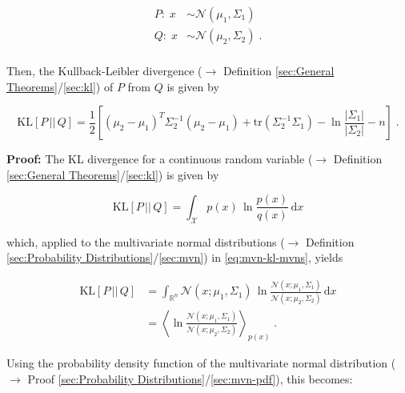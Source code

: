 \documentclass[a4paper,12pt,twoside]{book}
\begin{document}
\begin{equation} \label{eq:mvn-kl-mvns}
\begin{split}
P: \; x &\sim \mathcal{N}(\mu_1, \Sigma_1) \\
Q: \; x &\sim \mathcal{N}(\mu_2, \Sigma_2) \; . \\
\end{split}
\end{equation}

Then, the Kullback-Leibler divergence ($\rightarrow$ Definition \ref{sec:General Theorems}/\ref{sec:kl}) of $P$ from $Q$ is given by

\begin{equation} \label{eq:mvn-kl-mvn-KL}
\mathrm{KL}[P\,||\,Q] = \frac{1}{2} \left[ (\mu_2 - \mu_1)^T \Sigma_2^{-1} (\mu_2 - \mu_1) + \mathrm{tr}(\Sigma_2^{-1} \Sigma_1) - \ln \frac{|\Sigma_1|}{|\Sigma_2|} - n \right] \; .
\end{equation}


\vspace{1em}
\textbf{Proof:} The KL divergence for a continuous random variable ($\rightarrow$ Definition \ref{sec:General Theorems}/\ref{sec:kl}) is given by 

\begin{equation} \label{eq:mvn-kl-KL-cont}
\mathrm{KL}[P\,||\,Q] = \int_{\mathcal{X}} p(x) \, \ln \frac{p(x)}{q(x)} \, \mathrm{d}x
\end{equation}

which, applied to the multivariate normal distributions ($\rightarrow$ Definition \ref{sec:Probability Distributions}/\ref{sec:mvn}) in \eqref{eq:mvn-kl-mvns}, yields

\begin{equation} \label{eq:mvn-kl-mvn-KL-s1}
\begin{split}
\mathrm{KL}[P\,||\,Q] &= \int_{\mathbb{R}^n} \mathcal{N}(x; \mu_1, \Sigma_1) \, \ln \frac{\mathcal{N}(x; \mu_1, \Sigma_1)}{\mathcal{N}(x; \mu_2, \Sigma_2)} \, \mathrm{d}x \\
&= \left\langle \ln \frac{\mathcal{N}(x; \mu_1, \Sigma_1)}{\mathcal{N}(x; \mu_2, \Sigma_2)} \right\rangle_{p(x)} \; .
\end{split}
\end{equation}

Using the probability density function of the multivariate normal distribution ($\rightarrow$ Proof \ref{sec:Probability Distributions}/\ref{sec:mvn-pdf}), this becomes:
\end{document}

